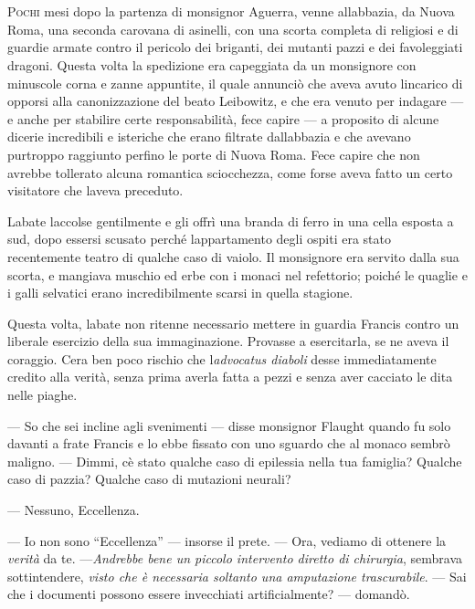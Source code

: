 	\chapter{\phantom{title}}

\lettrine{P}{ochi} mesi dopo la partenza di monsignor Aguerra, venne
all\textquotesingle abbazia, da Nuova Roma, una seconda carovana di
asinelli, con una scorta completa di religiosi e di guardie armate
contro il pericolo dei briganti, dei mutanti pazzi e dei favoleggiati
dragoni. Questa volta la spedizione era capeggiata da un monsignore con
minuscole corna e zanne appuntite, il quale annunciò che aveva avuto
l\textquotesingle incarico di opporsi alla canonizzazione del beato
Leibowitz, e che era venuto per indagare --- e anche per stabilire certe
responsabilità, fece capire --- a proposito di alcune dicerie
incredibili e isteriche che erano filtrate dall\textquotesingle abbazia
e che avevano purtroppo raggiunto perfino le porte di Nuova Roma. Fece
capire che non avrebbe tollerato alcuna romantica sciocchezza, come
forse aveva fatto un certo visitatore che l\textquotesingle aveva
preceduto.

L\textquotesingle abate l\textquotesingle accolse gentilmente e gli
offrì una branda di ferro in una cella esposta a sud, dopo essersi
scusato perché l\textquotesingle appartamento degli ospiti era stato
recentemente teatro di qualche caso di vaiolo. Il monsignore era servito
dalla sua scorta, e mangiava muschio ed erbe con i monaci nel
refettorio; poiché le quaglie e i galli selvatici erano incredibilmente
scarsi in quella stagione.

Questa volta, l\textquotesingle abate non ritenne necessario mettere in
guardia Francis contro un liberale esercizio della sua immaginazione.
Provasse a esercitarla, se ne aveva il coraggio. C\textquotesingle era
ben poco rischio che l\textquotesingle{}\emph{advocatus diaboli} desse
immediatamente credito alla verità, senza prima averla fatta a pezzi e
senza aver cacciato le dita nelle piaghe.

--- So che sei incline agli svenimenti --- disse monsignor Flaught
quando fu solo davanti a frate Francis e lo ebbe fissato con uno sguardo
che al monaco sembrò maligno. --- Dimmi, c\textquotesingle è stato
qualche caso di epilessia nella tua famiglia? Qualche caso di pazzia?
Qualche caso di mutazioni neurali?

--- Nessuno, Eccellenza.

--- Io non sono ``Eccellenza'' --- insorse il prete. --- Ora, vediamo di
ottenere la \emph{verità} da te. ---\emph{Andrebbe bene un piccolo
	intervento diretto di chirurgia}, sembrava sottintendere, \emph{visto
	che è necessaria soltanto una amputazione trascurabile}. --- Sai che i
documenti possono essere invecchiati artificialmente? --- domandò.

